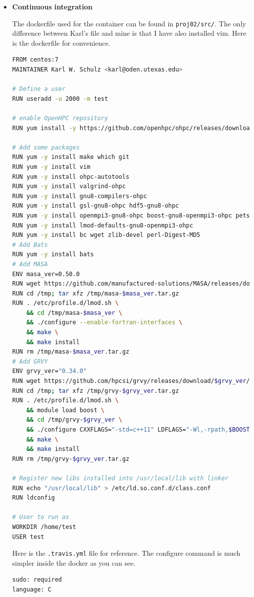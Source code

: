 \documentclass[12 pt, final]{article}
\begin{document}
\begin{itemize}
\item \textbf{Continuous integration}

The dockerfile used for the container can be found in \texttt{proj02/src/}. The only difference between Karl's file and mine is that I have also installed vim. Here is the dockerfile for convenience.
\begin{lstlisting}[language=bash,escapechar=\%]
FROM centos:7
MAINTAINER Karl W. Schulz <karl@oden.utexas.edu>

# Define a user
RUN useradd -u 2000 -m test

# enable OpenHPC repository
RUN yum install -y https://github.com/openhpc/ohpc/releases/download/v1.3.GA/ohpc-release-1.3-1.el7.x86_64.rpm

# Add some packages
RUN yum -y install make which git
RUN yum -y install vim
RUN yum -y install ohpc-autotools
RUN yum -y install valgrind-ohpc
RUN yum -y install gnu8-compilers-ohpc
RUN yum -y install gsl-gnu8-ohpc hdf5-gnu8-ohpc
RUN yum -y install openmpi3-gnu8-ohpc boost-gnu8-openmpi3-ohpc petsc-gnu8-openmpi3-ohpc
RUN yum -y install lmod-defaults-gnu8-openmpi3-ohpc
RUN yum -y install bc wget zlib-devel perl-Digest-MD5
# Add Bats
RUN yum -y install bats
# Add MASA
ENV masa_ver=0.50.0
RUN wget https://github.com/manufactured-solutions/MASA/releases/download/$masa_ver/masa-$masa_ver.tar.gz -P /tmp
RUN cd /tmp; tar xfz /tmp/masa-$masa_ver.tar.gz
RUN . /etc/profile.d/lmod.sh \
    && cd /tmp/masa-$masa_ver \
    && ./configure --enable-fortran-interfaces \
    && make \
    && make install
RUN rm /tmp/masa-$masa_ver.tar.gz
# Add GRVY
ENV grvy_ver="0.34.0"
RUN wget https://github.com/hpcsi/grvy/releases/download/$grvy_ver/grvy-$grvy_ver.tar.gz -P /tmp
RUN cd /tmp; tar xfz /tmp/grvy-$grvy_ver.tar.gz
RUN . /etc/profile.d/lmod.sh \
    && module load boost \
    && cd /tmp/grvy-$grvy_ver \
    && ./configure CXXFLAGS="-std=c++11" LDFLAGS="-Wl,-rpath,$BOOST_LIB" \
    && make \
    && make install
RUN rm /tmp/grvy-$grvy_ver.tar.gz

# Register new libs installed into /usr/local/lib with linker
RUN echo "/usr/local/lib" > /etc/ld.so.conf.d/class.conf
RUN ldconfig

# User to run as
WORKDIR /home/test
USER test
\end{lstlisting}

Here is the \texttt{.travis.yml} file for reference. The configure command is much simpler inside the docker as you can see.

\begin{lstlisting}[language=bash,escapechar=\%]
sudo: required
language: C


\end{lstlisting}
\end{itemize}
\end{document}
